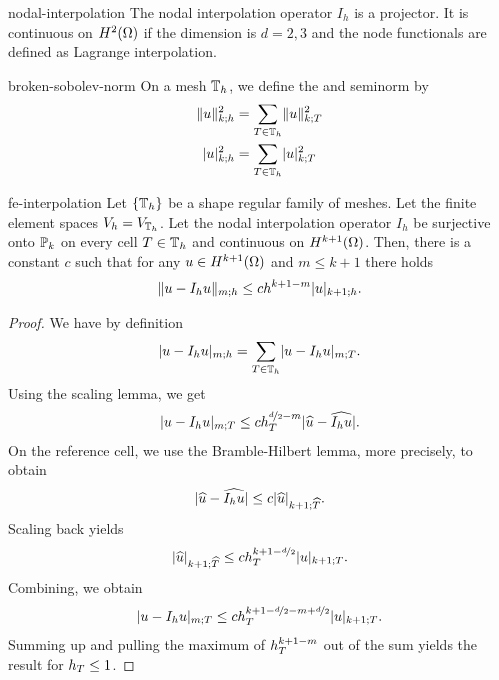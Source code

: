 \begin{Lemma}{nodal-interpolation}
  The nodal interpolation operator $I_h$ is a projector. It is
  continuous on $H^2(\domain)$ if the dimension is $d=2,3$ and the
  node functionals are defined as Lagrange interpolation.
\end{Lemma}

\begin{Definition}{broken-sobolev-norm}
  On a mesh $\mesh_h$, we define the  and
  seminorm by
  \begin{gather}
    \begin{split}
      \norm{u}_{k;h}^2 &= \sum_{\cell\in\mesh_h} \norm{u}_{k;\cell}^2\\
      \snorm{u}_{k;h}^2 &= \sum_{\cell\in\mesh_h} \snorm{u}_{k;\cell}^2
    \end{split}
  \end{gather}
\end{Definition}

\begin{Theorem}{fe-interpolation}
  Let $\{\mesh_h\}$ be a shape regular family of meshes.
  Let the finite element spaces $V_h = V_{\mesh_h}$. Let the nodal
  interpolation operator $I_h$ be surjective onto $\P_k$ on every cell
  $\cell\in\mesh_h$ and continuous on $H^{k+1}(\domain)$. Then, there
  is a constant $c$ such that for any $u\in H^{k+1}(\domain)$ and
  $m\le k+1$ there holds
  \begin{gather}
    \norm{u-I_h u}_{m;h} \le c h^{k+1-m} \snorm{u}_{k+1;h}.
  \end{gather}
\end{Theorem}

\begin{proof}
  We have by definition
  \begin{gather*}
    \snorm{u-I_h u}_{m;h} = \sum_{\cell\in\mesh_h} \snorm{u-I_h u}_{m;\cell}.
  \end{gather*}
  Using the scaling lemma, we get
  \begin{gather*}
    \snorm{u-I_h u}_{m;\cell}
    \le c h_\cell^{\nicefrac d2-m} \snorm{\refu - \widehat{I_hu}}.
  \end{gather*}
  On the reference cell, we use the Bramble-Hilbert lemma, more
  precisely,  to obtain
  \begin{gather*}
    \snorm{\refu - \widehat{I_hu}} \le c \snorm{\refu}_{k+1;\refcell}.
  \end{gather*}
  Scaling back yields
  \begin{gather*}
    \snorm{\refu}_{k+1;\refcell}
    \le c h_\cell^{k+1-\nicefrac d2} \snorm{u}_{k+1;\cell}.
  \end{gather*}
  Combining, we obtain
  \begin{gather*}
    \snorm{u-I_h u}_{m;\cell} \le c h_\cell^{k+1-\nicefrac d2 - m +
      \nicefrac d2}\snorm{u}_{k+1;\cell}.
  \end{gather*}
  Summing up and pulling the maximum of $h_\cell^{k+1-m}$ out of the
  sum yields the result for $h_\cell \le 1$.
\end{proof}

